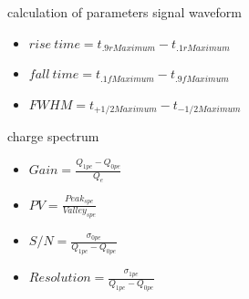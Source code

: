 \documentclass[11pt,compress,xcolor=x11names,UTF8]{beamer}
\begin{document}
%
%
%
\begin{frame}{calculation of parameters}
signal waveform
\begin{itemize}
\item  $rise\ time=t_{.9rMaximum}-t_{.1rMaximum}$
\item $fall\ time=t_{.1fMaximum}-t_{.9fMaximum}$
\item $FWHM=t_{+1/2Maximum}-t_{-1/2Maximum}$
\end{itemize}

charge spectrum
\begin{itemize}
\item  $Gain=\frac{Q_{1pe}-Q_{0pe}}{Q_e}$
\item $PV=\frac{Peak_{spe}}{Valley_{spe}}$
\item $S/N=\frac{\sigma_{0pe}}{Q_{1pe}-Q_{0pe}}$
\item $Resolution=\frac{\sigma_{1pe}}{Q_{1pe}-Q_{0pe}}$
\end{itemize}


\end{frame}
\end{document}
